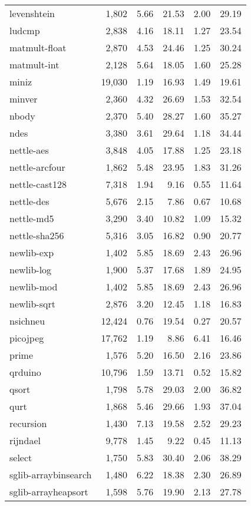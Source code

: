 \begin{table}[ptb]
{\begin{tabular}{@{}lrrrrr@{}}
levenshtein & 1,802 & 5.66 & 21.53 & 2.00 & 29.19 \\
ludcmp & 2,838 & 4.16 & 18.11 & 1.27 & 23.54 \\
matmult-float & 2,870 & 4.53 & 24.46 & 1.25 & 30.24 \\
matmult-int & 2,128 & 5.64 & 18.05 & 1.60 & 25.28 \\
miniz & 19,030 & 1.19 & 16.93 & 1.49 & 19.61 \\
minver & 2,360 & 4.32 & 26.69 & 1.53 & 32.54 \\
nbody & 2,370 & 5.40 & 28.27 & 1.60 & 35.27 \\
ndes & 3,380 & 3.61 & 29.64 & 1.18 & 34.44 \\
nettle-aes & 3,848 & 4.05 & 17.88 & 1.25 & 23.18 \\
nettle-arcfour & 1,862 & 5.48 & 23.95 & 1.83 & 31.26 \\
nettle-cast128 & 7,318 & 1.94 & 9.16 & 0.55 & 11.64 \\
nettle-des & 5,676 & 2.15 & 7.86 & 0.67 & 10.68 \\
nettle-md5 & 3,290 & 3.40 & 10.82 & 1.09 & 15.32 \\
nettle-sha256 & 5,316 & 3.05 & 16.82 & 0.90 & 20.77 \\
newlib-exp & 1,402 & 5.85 & 18.69 & 2.43 & 26.96 \\
newlib-log & 1,900 & 5.37 & 17.68 & 1.89 & 24.95 \\
newlib-mod & 1,402 & 5.85 & 18.69 & 2.43 & 26.96 \\
newlib-sqrt & 2,876 & 3.20 & 12.45 & 1.18 & 16.83 \\
nsichneu & 12,424 & 0.76 & 19.54 & 0.27 & 20.57 \\
picojpeg & 17,762 & 1.19 & 8.86 & 6.41 & 16.46 \\
prime & 1,576 & 5.20 & 16.50 & 2.16 & 23.86 \\
qrduino & 10,796 & 1.59 & 13.71 & 0.52 & 15.82 \\
qsort & 1,798 & 5.78 & 29.03 & 2.00 & 36.82 \\
qurt & 1,868 & 5.46 & 29.66 & 1.93 & 37.04 \\
recursion & 1,430 & 7.13 & 19.58 & 2.52 & 29.23 \\
rijndael & 9,778 & 1.45 & 9.22 & 0.45 & 11.13 \\
select & 1,750 & 5.83 & 30.40 & 2.06 & 38.29 \\
sglib-arraybinsearch & 1,480 & 6.22 & 18.38 & 2.30 & 26.89 \\
sglib-arrayheapsort & 1,598 & 5.76 & 19.90 & 2.13 & 27.78 \\

\end{tabular}}
\end{table}
